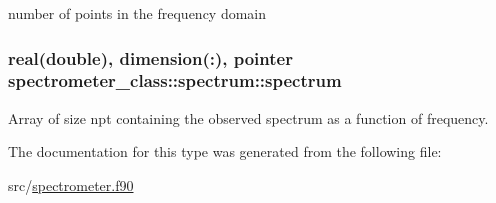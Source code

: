 number of points in the frequency domain 

\hypertarget{structspectrometer__class_1_1spectrum_a9f42df4722fd9d17f514de0dbe1a50da}{
\subsubsection[{spectrum}]{\setlength{\rightskip}{0pt plus 5cm}real(double), dimension(\-:), pointer spectrometer\-\_\-class\-::spectrum\-::spectrum\hspace{0.3cm}{\ttfamily [private]}}}\label{structspectrometer__class_1_1spectrum_a9f42df4722fd9d17f514de0dbe1a50da}


Array of size npt containing the observed spectrum as a function of frequency. 



The documentation for this type was generated from the following file\-:\begin{DoxyCompactItemize}
\item 
src/\hyperlink{spectrometer_8f90}{spectrometer.\-f90}\end{DoxyCompactItemize}
